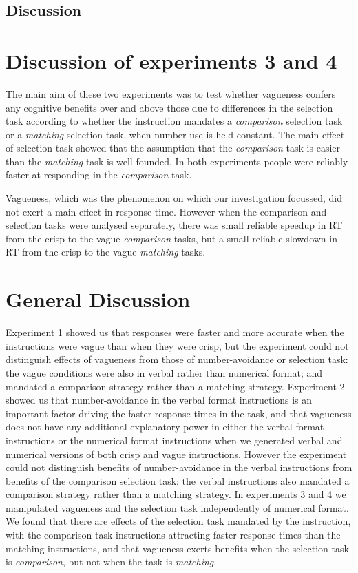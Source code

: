 \subsection{Discussion}
\textcolor{red}{\lipsum[2]}
\section{Discussion of experiments 3 and 4}

The main aim of these two experiments was to test whether vagueness confers any cognitive benefits over and above those due to differences in the selection task according to whether the instruction mandates a \emph{comparison} selection task or a \emph{matching} selection task, when number-use is held constant.  The main effect of selection task showed that the assumption that the \emph{comparison} task is easier than the \emph{matching} task is well-founded. In both experiments people were reliably faster at responding in the \emph{comparison} task. 

Vagueness, which was the phenomenon  on which our investigation focussed, did not exert a main effect in response time. However when the comparison and selection tasks were analysed separately, there was small reliable speedup in RT from the crisp to the vague \emph{comparison} tasks, but a small reliable slowdown in RT from the crisp to the vague \emph{matching} tasks. 

\section{General Discussion}

Experiment 1 showed us that responses were faster and more accurate when the instructions were vague than when they were crisp, but the experiment could not distinguish effects of vagueness from those of number-avoidance or selection task: the vague conditions were also in verbal rather than numerical format; and mandated a comparison strategy rather than a matching strategy.  Experiment 2 showed us that number-avoidance in the verbal format instructions is an important factor driving the faster response times in the task, and that vagueness does not have any additional explanatory power in either the verbal format instructions or the numerical format instructions when we generated verbal and numerical versions of both crisp and vague instructions. However the experiment could not distinguish benefits of number-avoidance in the verbal instructions from benefits of the comparison selection task: the verbal instructions also mandated a comparison strategy rather than a matching strategy. In experiments 3 and 4 we manipulated vagueness and the selection task independently of numerical format. We found that there are effects of the selection task mandated by the instruction, with the comparison task instructions attracting faster response times than the matching instructions, and that vagueness exerts benefits when the selection task is \emph{comparison}, but not when the task is \emph{matching}.

